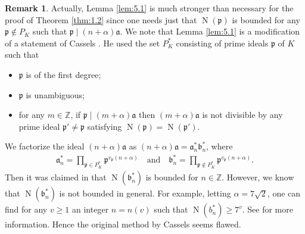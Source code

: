 \documentclass[a4paper,11pt]{amsart}
\theoremstyle{definition}
\newtheorem{remark}[theorem]{Remark}
\numberwithin{equation}{section}
\DeclareMathOperator{\norm}{N}
\begin{document}
\begin{remark}\label{rem:5.5}
Actually, Lemma \ref{lem:5.1} is much stronger than necessary for the proof of Theorem \ref{thm:1.2} since one needs just that $\norm(\mathfrak{p})$ is bounded for any $\mathfrak{p} \notin P_K$ such that $\mathfrak{p} \mid (n+\alpha)\mathfrak{a}$. 
We note that Lemma \ref{lem:5.1} is a modification of a statement of Cassels \cite{Cassels1961}. 
He used the set $P_K^*$ consisting of prime ideals $\mathfrak{p}$ of $K$ such that
\begin{itemize}
\item[$(\mathrm{i})$]
$\mathfrak{p}$ is of the first degree; 
\item[$(\mathrm{ii})$]
$\mathfrak{p}$ is unambiguous; 
\item[$(\mathrm{iii})$]
for any $m \in \mathbb{Z}$, if $\mathfrak{p} \mid (m+\alpha) \mathfrak{a}$ then $(m+\alpha) \mathfrak{a}$ is not divisible by any prime ideal $\mathfrak{p}' \neq \mathfrak{p}$ satisfying $\norm(\mathfrak{p})=\norm(\mathfrak{p}')$. 
\end{itemize}
We factorize the ideal $(n+\alpha)\mathfrak{a}$ as $(n+\alpha)\mathfrak{a}=\mathfrak{a}_n^* \mathfrak{b}_n^*$, where
\begin{align*}
\mathfrak{a}_n^*
= \prod_{\mathfrak{p} \in P_K^*} \mathfrak{p}^{v_{\mathfrak{p}}(n+\alpha)}
\quad\text{and}\quad
\mathfrak{b}_n^*
= \prod_{\mathfrak{p} \notin P_K^*} \mathfrak{p}^{v_{\mathfrak{p}}(n+\alpha)}. 
\end{align*}
Then it was claimed in \cite[p.~181]{Cassels1961} that $\norm(\mathfrak{b}_n^*)$ is bounded for $n \in \mathbb{Z}$. 
However, we know that $\norm(\mathfrak{b}_n^*)$ is not bounded in general. 
For example, letting $\alpha=7\sqrt{2}$, one can find for any $v \geq1$ an integer $n=n(v)$ such that $\norm(b_n^*) \geq 7^v$. 
See \cite[Remark 1.6]{Mine2022+} for more information. 
Hence the original method by Cassels seems flawed. 


\end{remark}
\end{document}
